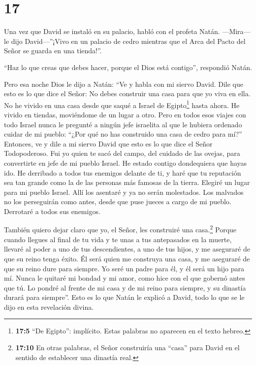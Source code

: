 \hypertarget{section-16}{%
\section{17}\label{section-16}}

 Una vez que David se instaló en su palacio, habló con el
profeta Natán. ---Mira---le dijo David---''¡Vivo en un palacio de cedro
mientras que el Arca del Pacto del Señor se guarda en una tienda!''.

 ``Haz lo que creas que debes hacer, porque el Dios está
contigo'', respondió Natán.

 Pero esa noche Dios le dijo a Natán:  ``Ve y
habla con mi siervo David. Dile que esto es lo que dice el Señor: No
debes construir una casa para que yo viva en ella.  No he
vivido en una casa desde que saqué a Israel de Egipto\footnote{\textbf{17:5}
  ``De Egipto'': implícito. Estas palabras no aparecen en el texto
  hebreo.} hasta ahora. He vivido en tiendas, moviéndome de un lugar a
otro.  Pero en todos esos viajes con todo Israel nunca le
pregunté a ningún jefe israelita al que le hubiera ordenado cuidar de mi
pueblo: ``¿Por qué no has construido una casa de cedro para mí?''
 Entonces, ve y dile a mi siervo David que esto es lo que
dice el Señor Todopoderoso. Fui yo quien te sacó del campo, del cuidado
de las ovejas, para convertirte en jefe de mi pueblo Israel.
 He estado contigo dondequiera que hayas ido. He derribado a
todos tus enemigos delante de ti, y haré que tu reputación sea tan
grande como la de las personas más famosas de la tierra. 
Elegiré un lugar para mi pueblo Israel. Allí los asentaré y ya no serán
molestados. Los malvados no los perseguirán como antes, 
desde que puse jueces a cargo de mi pueblo. Derrotaré a todos sus
enemigos.

También quiero dejar claro que yo, el Señor, les construiré una
casa.\footnote{\textbf{17:10} En otras palabras, el Señor construiría
  una ``casa'' para David en el sentido de establecer una dinastía real.}
 Porque cuando llegues al final de tu vida y te unas a tus
antepasados en la muerte, llevaré al poder a uno de tus descendientes, a
uno de tus hijos, y me aseguraré de que su reino tenga éxito.
 Él será quien me construya una casa, y me aseguraré de que
su reino dure para siempre.  Yo seré un padre para él, y él
será un hijo para mí. Nunca le quitaré mi bondad y mi amor, como hice
con el que gobernó antes que tú.  Lo pondré al frente de mi
casa y de mi reino para siempre, y su dinastía durará para siempre''.
 Esto es lo que Natán le explicó a David, todo lo que se le
dijo en esta revelación divina.

